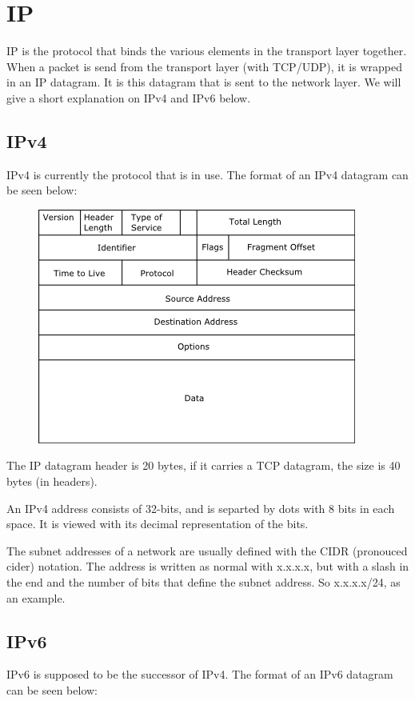 \section{IP}
IP is the protocol that binds the various elements in the transport
layer together. When a packet is send from the transport layer (with
TCP/UDP), it is wrapped in an IP datagram. It is this datagram that is
sent to the network layer. We will give a short explanation on IPv4
and IPv6 below.

\subsection{IPv4}
IPv4 is currently the protocol that is in use. The format of an IPv4
datagram can be seen below:

\begin{figure}
  \begin{center}
    \includegraphics[scale=0.5]{IPv4dg.png}
  \end{center}
\end{figure}

The IP datagram header is 20 bytes, if it carries a TCP datagram, the
size is 40 bytes (in headers).

An IPv4 address consists of 32-bits, and is separted by dots with 8
bits in each space. It is viewed with its decimal representation of
the bits.

The subnet addresses of a network are usually defined with the CIDR
(pronouced cider) notation. The address is written as normal with
x.x.x.x, but with a slash in the end and the number of bits that
define the subnet address. So x.x.x.x/24, as an example.

\subsection{IPv6}
IPv6 is supposed to be the successor of IPv4. The format of an IPv6
datagram can be seen below:

